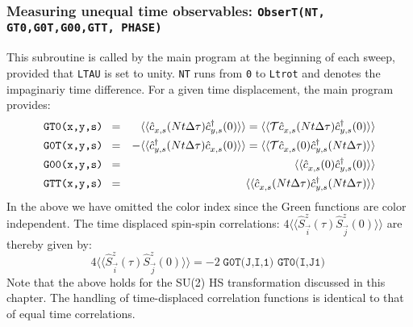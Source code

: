 \subsubsection{Measuring  unequal time observables: \texttt{ObserT(NT,  GT0,G0T,G00,GTT, PHASE) }}

This subroutine is called by the main program at the beginning of each sweep, provided that \texttt{LTAU}  is set to unity.  \texttt{NT} runs from \texttt{0}  to \texttt{Ltrot} and denotes the   impaginariy time difference.   For a given time  displacement, the main program provides:
\begin{eqnarray}
\texttt{GT0(x,y,s) }  = & &    \langle \langle \hat{c}^{\phantom\dagger}_{x,s} (Nt \Delta \tau)   \hat{c}^{\dagger}_{y,s} (0)   \rangle \rangle = \langle \langle {\cal T} \hat{c}^{\phantom\dagger}_{x,s} (Nt \Delta \tau)   \hat{c}^{\dagger}_{y,s} (0)   \rangle \rangle  \nonumber \\
\texttt{G0T(x,y,s) }   = &&  -   \langle \langle   \hat{c}^{\dagger}_{y,s} (Nt \Delta \tau)    \hat{c}^{\phantom\dagger}_{x,s} (0)    \rangle \rangle =
    \langle \langle {\cal T} \hat{c}^{\phantom\dagger}_{x,s} (0)    \hat{c}^{\dagger}_{y,s} (Nt \Delta \tau)   \rangle \rangle  \nonumber  \\
  \texttt{G00(x,y,s) }  = & &    \langle \langle \hat{c}^{\phantom\dagger}_{x,s} (0)   \hat{c}^{\dagger}_{y,s} (0)   \rangle \rangle    \nonumber \\
    \texttt{GTT(x,y,s) }  = & &    \langle \langle \hat{c}^{\phantom\dagger}_{x,s} (Nt \Delta \tau)   \hat{c}^{\dagger}_{y,s} (Nt \Delta \tau)   \rangle \rangle    
\end{eqnarray}
In the above we have omitted the color index since  the  Green functions are color independent.  The time displaced  spin-spin correlations: 
$ 4 \langle \langle \hat{S}^{z}_{\vec{i}} (\tau)  \hat{S}^{z}_{\vec{j}} (0)\rangle \rangle   $ 
are thereby given by: 
\begin{equation}
	4 \langle \langle \hat{S}^{z}_{\vec{i}} (\tau)  \hat{S}^{z}_{\vec{j}} (0)\rangle \rangle   = - 2 \; \texttt{G0T(J,I,1) } \texttt{GT0(I,J1) } 
\end{equation}
Note that the above holds for the SU(2) HS transformation discussed in this chapter. 
The handling of time-displaced correlation functions is identical to that of equal time correlations. 




